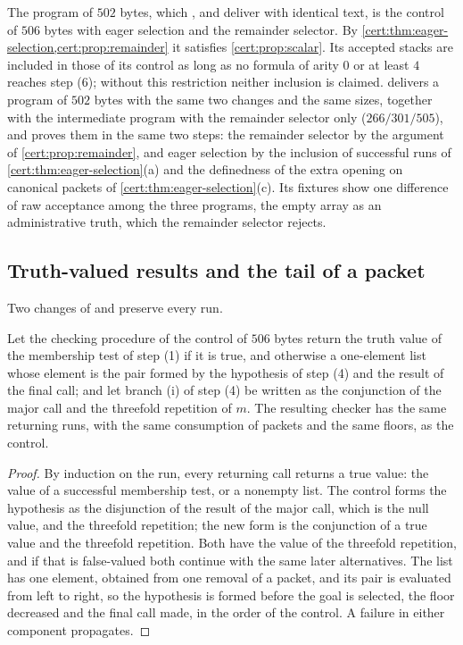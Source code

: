 The program of $502$ bytes, which ,
 and  deliver with
identical text, is the control of $506$ bytes with eager selection and the
remainder selector. By \cref{cert:thm:eager-selection,cert:prop:remainder} it
satisfies \cref{cert:prop:scalar}. Its accepted stacks are included in those
of its control as long as no formula of arity $0$ or at least $4$ reaches
step (6); without this restriction neither inclusion is claimed.
 delivers a program of $502$ bytes with the same two
changes and the same sizes, together with the intermediate program with the
remainder selector only ($266/301/505$), and proves them in the same two
steps: the remainder selector by the argument of \cref{cert:prop:remainder},
and eager selection by the inclusion of successful runs of
\cref{cert:thm:eager-selection}(a) and the definedness of the extra opening on
canonical packets of \cref{cert:thm:eager-selection}(c). Its fixtures show one
difference of raw acceptance among the three programs, the empty array as an
administrative truth, which the remainder selector rejects.

\subsection{Truth-valued results and the tail of a packet}

Two changes of  and  preserve
every run.

\begin{proposition}\label{cert:prop:truthy}
Let the checking procedure of the control of $506$ bytes return the truth
value of the membership test of step (1) if it is true, and otherwise a
one-element list whose element is the pair formed by the hypothesis of step
(4) and the result of the final call; and let branch (i) of step (4) be
written as the conjunction of the major call and the threefold repetition of
$m$. The resulting checker has the same returning runs, with the same
consumption of packets and the same floors, as the control.
\end{proposition}
\begin{proof}
By induction on the run, every returning call returns a true value: the value
of a successful membership test, or a nonempty list. The control forms the
hypothesis as the disjunction of the result of the major call, which is the
null value, and the threefold repetition; the new form is the conjunction of
a true value and the threefold repetition. Both have the value of the
threefold repetition, and if that is false-valued both continue with the
same later alternatives. The list has one element, obtained from one
removal of a packet, and its pair is evaluated from left to right, so the
hypothesis is formed before the goal is selected, the floor decreased and the
final call made, in the order of the control. A failure in either component
propagates.
\end{proof}

